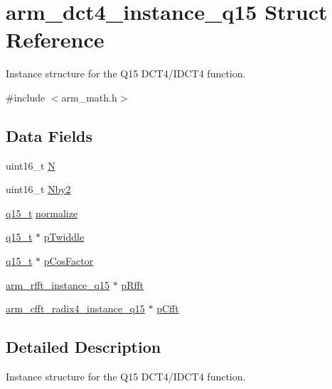 \hypertarget{structarm__dct4__instance__q15}{}\section{arm\+\_\+dct4\+\_\+instance\+\_\+q15 Struct Reference}
\label{structarm__dct4__instance__q15}


Instance structure for the Q15 D\+C\+T4/\+I\+D\+C\+T4 function.  




{\ttfamily \#include $<$arm\+\_\+math.\+h$>$}

\subsection*{Data Fields}
\begin{DoxyCompactItemize}
\item 
uint16\+\_\+t \mbox{\hyperlink{structarm__dct4__instance__q15_a37d49571fe35012087153c093705cd11}{N}}
\item 
uint16\+\_\+t \mbox{\hyperlink{structarm__dct4__instance__q15_afa64b1618089e35c2b55cff71cb29715}{Nby2}}
\item 
\mbox{\hyperlink{arm__math_8h_ab5a8fb21a5b3b983d5f54f31614052ea}{q15\+\_\+t}} \mbox{\hyperlink{structarm__dct4__instance__q15_a8ba8c9fa75542dac82553fee982ccd3e}{normalize}}
\item 
\mbox{\hyperlink{arm__math_8h_ab5a8fb21a5b3b983d5f54f31614052ea}{q15\+\_\+t}} $\ast$ \mbox{\hyperlink{structarm__dct4__instance__q15_aa8c837c05b2c910342ab8f171d30dc02}{p\+Twiddle}}
\item 
\mbox{\hyperlink{arm__math_8h_ab5a8fb21a5b3b983d5f54f31614052ea}{q15\+\_\+t}} $\ast$ \mbox{\hyperlink{structarm__dct4__instance__q15_a9d858d313cbba67ceaef9704bc9c43b0}{p\+Cos\+Factor}}
\item 
\mbox{\hyperlink{structarm__rfft__instance__q15}{arm\+\_\+rfft\+\_\+instance\+\_\+q15}} $\ast$ \mbox{\hyperlink{structarm__dct4__instance__q15_aea6aa42c838f2b22c8c31e9e259b8d75}{p\+Rfft}}
\item 
\mbox{\hyperlink{structarm__cfft__radix4__instance__q15}{arm\+\_\+cfft\+\_\+radix4\+\_\+instance\+\_\+q15}} $\ast$ \mbox{\hyperlink{structarm__dct4__instance__q15_ae0ac7c3a89699793fc0dac960db7f056}{p\+Cfft}}
\end{DoxyCompactItemize}


\subsection{Detailed Description}
Instance structure for the Q15 D\+C\+T4/\+I\+D\+C\+T4 function. 

